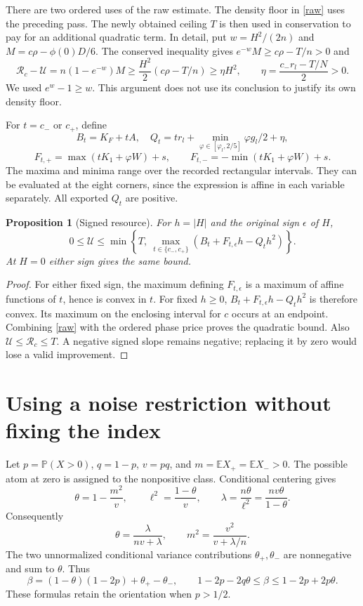 \documentclass[11pt]{article}
\newcommand{\E}{\mathbb E}\newcommand{\CE}{C_{\rm E}}
\newtheorem{proposition}{Proposition}\newtheorem{lemma}{Lemma}
\begin{document}
There are two ordered uses of the raw estimate. The density floor in
\eqref{raw} uses the preceding pass. The newly obtained ceiling $T$ is
then used in conservation to pay for an additional quadratic term.
In detail, put $w=H^2/(2n)$ and $M=c\rho-\phi(0)D/6$.
The conserved inequality gives $e^{-w}M\ge c\rho-T/n>0$ and
\[
 \mathcal R_c-\mathcal U=n(1-e^{-w})M
 \ge \frac{H^2}{2}(c\rho-T/n)\ge\eta H^2,
 \qquad
 \eta=\frac{c_-r_l-T/N}{2}>0.
\]
We used $e^w-1\ge w$. This argument does not use its conclusion to
justify its own density floor.

For $t=c_-$ or $c_+$, define
\[
 B_t=K_F+tA,\quad
 Q_t=tr_l+\min_{\varphi\in[\varphi_l,2/5]}\varphi g_l/2+\eta,
\]
\[
 F_{t,+}=\max(tK_1+\varphi W)+s,\qquad
 F_{t,-}=-\min(tK_1+\varphi W)+s.
\]
The maxima and minima range over the recorded rectangular intervals.
They can be evaluated at the eight corners, since the expression is
affine in each variable separately. All exported $Q_t$ are positive.

\begin{proposition}[Signed resource]\label{signed}
For $h=|H|$ and the original sign $\epsilon$ of $H$,
\[
 0\le\mathcal U\le
 \min\left\{T,\ 
 \max_{t\in\{c_-,c_+\}}
       (B_t+F_{t,\epsilon}h-Q_th^2)\right\}.
\]
At $H=0$ either sign gives the same bound.
\end{proposition}
\begin{proof}
For either fixed sign, the maximum defining $F_{t,\epsilon}$ is a
maximum of affine functions of $t$, hence is convex in $t$.
For fixed $h\ge0$, $B_t+F_{t,\epsilon}h-Q_th^2$ is therefore convex.
Its maximum on the enclosing interval for $c$ occurs at an endpoint.
Combining \eqref{raw} with the ordered phase price proves the quadratic
bound. Also $\mathcal U\le\mathcal R_c\le T$.
A negative signed slope remains negative; replacing it by zero would
lose a valid improvement.
\end{proof}

\section{Using a noise restriction without fixing the index}
Let $p=\mathbb P(X>0)$, $q=1-p$, $v=pq$, and
$m=\E X_+=\E X_->0$. The possible atom at zero is assigned to the
nonpositive class. Conditional centering gives
\[
 \theta=1-\frac{m^2}{v},\qquad
 \ell^2=\frac{1-\theta}{v},\qquad
 \lambda=\frac{n\theta}{\ell^2}
          =\frac{nv\theta}{1-\theta}.
\]
Consequently
\begin{equation}\label{identities}
 \theta=\frac{\lambda}{nv+\lambda},\qquad
 m^2=\frac{v^2}{v+\lambda/n}.
\end{equation}
The two unnormalized conditional variance contributions $\theta_+,\theta_-$
are nonnegative and sum to $\theta$. Thus
\[
 \beta=(1-\theta)(1-2p)+\theta_+-\theta_-,
 \qquad
 1-2p-2q\theta\le\beta\le1-2p+2p\theta.
\]
These formulas retain the orientation when $p>1/2$.
\end{document}
